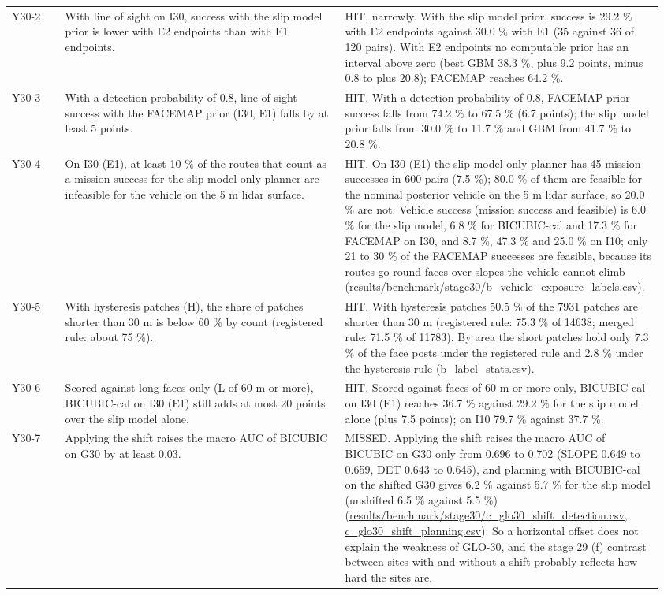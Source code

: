 \documentclass[10pt]{article}
\begin{document}
\begin{longtable}{@{}p{0.08\linewidth}p{0.42\linewidth}p{0.46\linewidth}@{}}
Y30-2 & With line of sight on I30, success with the slip model prior is lower with E2 endpoints than with E1 endpoints. & HIT, narrowly. With the slip model prior, success is 29.2 \% with E2 endpoints against 30.0 \% with E1 (35 against 36 of 120 pairs). With E2 endpoints no computable prior has an interval above zero (best GBM 38.3 \%, plus 9.2 points, minus 0.8 to plus 20.8); FACEMAP reaches 64.2 \%. \\
Y30-3 & With a detection probability of 0.8, line of sight success with the FACEMAP prior (I30, E1) falls by at least 5 points. & HIT. With a detection probability of 0.8, FACEMAP prior success falls from 74.2 \% to 67.5 \% (6.7 points); the slip model prior falls from 30.0 \% to 11.7 \% and GBM from 41.7 \% to 20.8 \%. \\
Y30-4 & On I30 (E1), at least 10 \% of the routes that count as a mission success for the slip model only planner are infeasible for the vehicle on the 5 m lidar surface. & HIT. On I30 (E1) the slip model only planner has 45 mission successes in 600 pairs (7.5 \%); 80.0 \% of them are feasible for the nominal posterior vehicle on the 5 m lidar surface, so 20.0 \% are not. Vehicle success (mission success and feasible) is 6.0 \% for the slip model, 6.8 \% for BICUBIC-cal and 17.3 \% for FACEMAP on I30, and 8.7 \%, 47.3 \% and 25.0 \% on I10; only 21 to 30 \% of the FACEMAP successes are feasible, because its routes go round faces over slopes the vehicle cannot climb (\url{results/benchmark/stage30/b_vehicle_exposure_labels.csv}). \\
Y30-5 & With hysteresis patches (H), the share of patches shorter than 30 m is below 60 \% by count (registered rule: about 75 \%). & HIT. With hysteresis patches 50.5 \% of the 7931 patches are shorter than 30 m (registered rule: 75.3 \% of 14638; merged rule: 71.5 \% of 11783). By area the short patches hold only 7.3 \% of the face posts under the registered rule and 2.8 \% under the hysteresis rule (\url{b_label_stats.csv}). \\
Y30-6 & Scored against long faces only (L of 60 m or more), BICUBIC-cal on I30 (E1) still adds at most 20 points over the slip model alone. & HIT. Scored against faces of 60 m or more only, BICUBIC-cal on I30 (E1) reaches 36.7 \% against 29.2 \% for the slip model alone (plus 7.5 points); on I10 79.7 \% against 37.7 \%. \\
Y30-7 & Applying the shift raises the macro AUC of BICUBIC on G30 by at least 0.03. & MISSED. Applying the shift raises the macro AUC of BICUBIC on G30 only from 0.696 to 0.702 (SLOPE 0.649 to 0.659, DET 0.643 to 0.645), and planning with BICUBIC-cal on the shifted G30 gives 6.2 \% against 5.7 \% for the slip model (unshifted 6.5 \% against 5.5 \%) (\url{results/benchmark/stage30/c_glo30_shift_detection.csv}, \url{c_glo30_shift_planning.csv}). So a horizontal offset does not explain the weakness of GLO-30, and the stage 29 (f) contrast between sites with and without a shift probably reflects how hard the sites are. \\

\end{longtable}
\end{document}
